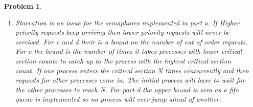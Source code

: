 \documentclass{article}
\theoremstyle{problemstyle}
\newtheorem{problem}{Problem}
\begin{document}
\begin{problem}
\begin{enumerate}[label=(\alph*)]
\begin{lstlisting}
Process: 0 Requesting Critical Section
Process: 0 Entering Critical Section
Process: 0 Exiting Critical Section
Process: 0 Requesting Critical Section
Process: 0 Entering Critical Section
Process: 0 Exiting Critical Section
Process: 0 Requesting Critical Section
Process: 0 Entering Critical Section
Process: 0 Exiting Critical Section
Process: 0 Requesting Critical Section
Process: 0 Entering Critical Section
Process: 0 Exiting Critical Section
Process: 0 Requesting Critical Section
Process: 0 Entering Critical Section
Process: 0 Exiting Critical Section
\end{lstlisting}
\item Starvation is an issue for the semaphores implemented in part a. If Higher priority requests keep arriving then lower priority requests will never be serviced. For c and d their is a bound on the number of out of order requests. For c the bound is the number of times it takes processes with lower critical section counts to catch up to the process with the highest critical section count. If one process enters the critical section N times concurrently and then requests for other processes come in. The initial process will have to wait for the other processes to reach N. For part d the upper bound is zero as a fifo queue is implemented so no process will ever jump ahead of another.
\end{enumerate}
\end{problem}
\newpage
\end{document}
